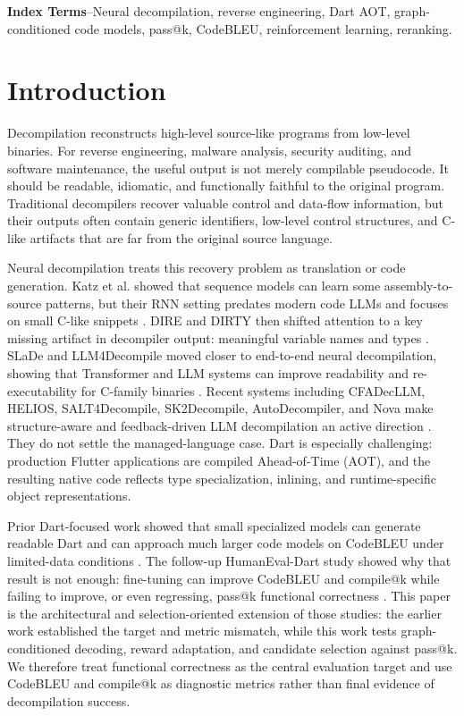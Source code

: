 \documentclass[11pt]{article}
\begin{document}
\noindent\textbf{Index Terms}--Neural decompilation, reverse engineering, Dart AOT, graph-conditioned code models, pass@k, CodeBLEU, reinforcement learning, reranking.

\section{Introduction}

Decompilation reconstructs high-level source-like programs from low-level binaries. For reverse engineering, malware analysis, security auditing, and software maintenance, the useful output is not merely compilable pseudocode. It should be readable, idiomatic, and functionally faithful to the original program. Traditional decompilers recover valuable control and data-flow information, but their outputs often contain generic identifiers, low-level control structures, and C-like artifacts that are far from the original source language.

Neural decompilation treats this recovery problem as translation or code generation. Katz et al. showed that sequence models can learn some assembly-to-source patterns, but their RNN setting predates modern code LLMs and focuses on small C-like snippets \cite{katz2018rnn}. DIRE and DIRTY then shifted attention to a key missing artifact in decompiler output: meaningful variable names and types \cite{lacomis2019dire,chen2022dirty}. SLaDe and LLM4Decompile moved closer to end-to-end neural decompilation, showing that Transformer and LLM systems can improve readability and re-executability for C-family binaries \cite{armengol2023slade,tan2024llm4decompile}. Recent systems including CFADecLLM, HELIOS, SALT4Decompile, SK2Decompile, AutoDecompiler, and Nova make structure-aware and feedback-driven LLM decompilation an active direction \cite{liu2025cfadecllm,achamyeleh2026helios,wang2025salt4decompile,tan2025sk2decompile,liu2026autodecompiler,jiang2025nova}. They do not settle the managed-language case. Dart is especially challenging: production Flutter applications are compiled Ahead-of-Time (AOT), and the resulting native code reflects type specialization, inlining, and runtime-specific object representations.

Prior Dart-focused work showed that small specialized models can generate readable Dart and can approach much larger code models on CodeBLEU under limited-data conditions \cite{abualazm2026idiomatic}. The follow-up HumanEval-Dart study showed why that result is not enough: fine-tuning can improve CodeBLEU and compile@k while failing to improve, or even regressing, pass@k functional correctness \cite{abualazm2026tosem}. This paper is the architectural and selection-oriented extension of those studies: the earlier work established the target and metric mismatch, while this work tests graph-conditioned decoding, reward adaptation, and candidate selection against pass@k. We therefore treat functional correctness as the central evaluation target and use CodeBLEU and compile@k as diagnostic metrics rather than final evidence of decompilation success.
\end{document}
